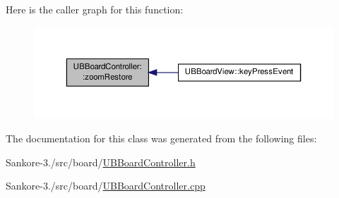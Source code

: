 Here is the caller graph for this function\-:
\nopagebreak
\begin{figure}[H]
\begin{center}
\leavevmode
\includegraphics[width=350pt]{d7/d62/class_u_b_board_controller_a0df0eca517bd4e5754f49ce1395ec1b1_icgraph}
\end{center}
\end{figure}




The documentation for this class was generated from the following files\-:\begin{DoxyCompactItemize}
\item 
Sankore-\/3./src/board/\hyperlink{_u_b_board_controller_8h}{U\-B\-Board\-Controller.\-h}\item 
Sankore-\/3./src/board/\hyperlink{_u_b_board_controller_8cpp}{U\-B\-Board\-Controller.\-cpp}\end{DoxyCompactItemize}
